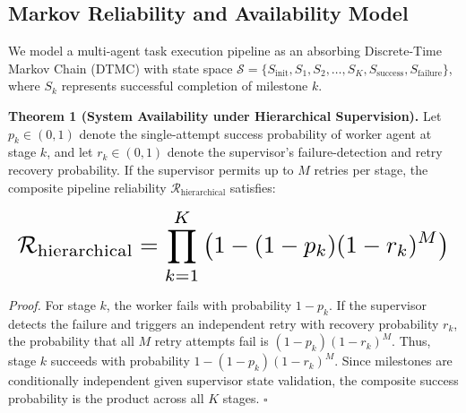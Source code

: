 \documentclass{article}
\begin{document}
\subsection{Markov Reliability and Availability Model}


We model a multi-agent task execution pipeline as an absorbing Discrete-Time Markov Chain (DTMC) with state space $\mathcal{S} = \{S_{\text{init}}, S_1, S_2, \ldots, S_K, S_{\text{success}}, S_{\text{failure}}\}$, where $S_k$ represents successful completion of milestone $k$.

\textbf{Theorem 1 (System Availability under Hierarchical Supervision).} Let $p_k \in (0, 1)$ denote the single-attempt success probability of worker agent at stage $k$, and let $r_k \in (0, 1)$ denote the supervisor's failure-detection and retry recovery probability. If the supervisor permits up to $M$ retries per stage, the composite pipeline reliability $\mathcal{R}_{\text{hierarchical}}$ satisfies:






















\begin{equation}
\resizebox{\columnwidth}{!}{$\displaystyle
\begin{aligned}
\mathcal{R}_{\text{hierarchical}} = \prod_{k=1}^K \left( 1 - (1 - p_k)(1 - r_k)^M \right)
\end{aligned}
$}
\end{equation}






















\textit{Proof.} For stage $k$, the worker fails with probability $1 - p_k$. If the supervisor detects the failure and triggers an independent retry with recovery probability $r_k$, the probability that all $M$ retry attempts fail is $(1 - p_k)(1 - r_k)^M$. Thus, stage $k$ succeeds with probability $1 - (1 - p_k)(1 - r_k)^M$. Since milestones are conditionally independent given supervisor state validation, the composite success probability is the product across all $K$ stages. $\square$
\end{document}

